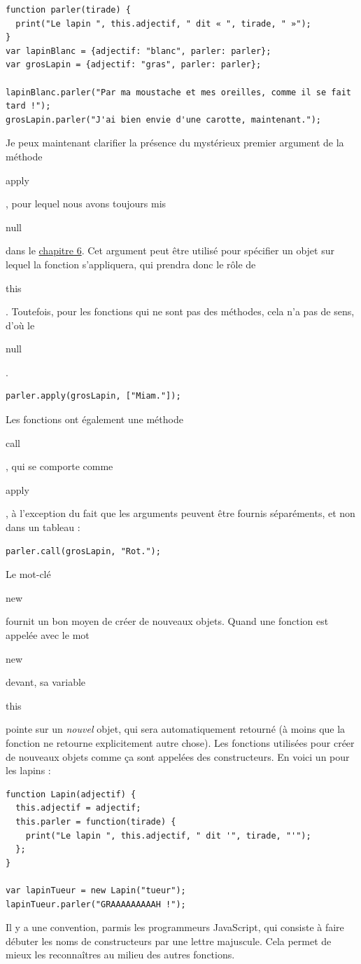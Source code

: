 \documentclass{FramateX}
\renewcommand{\texttt}[1]{\begin{sffamily}{#1}\end{sffamily}}
\begin{document}
\begin{lstlisting}
function parler(tirade) {
  print("Le lapin ", this.adjectif, " dit « ", tirade, " »");
}
var lapinBlanc = {adjectif: "blanc", parler: parler};
var grosLapin = {adjectif: "gras", parler: parler};

lapinBlanc.parler("Par ma moustache et mes oreilles, comme il se fait tard !");
grosLapin.parler("J'ai bien envie d'une carotte, maintenant.");
\end{lstlisting}
\begin{center}\end{center}

Je peux maintenant clarifier la présence du mystérieux premier argument
de la méthode \texttt{apply}, pour lequel nous avons toujours mis
\texttt{null} dans le \href{chapter6.html}{chapitre 6}. Cet argument
peut être utilisé pour spécifier un objet sur lequel la fonction
s'appliquera, qui prendra donc le rôle de \texttt{this}. Toutefois, pour
les fonctions qui ne sont pas des méthodes, cela n'a pas de sens, d'où
le \texttt{null}.

\begin{lstlisting}
parler.apply(grosLapin, ["Miam."]);
\end{lstlisting}
Les fonctions ont également une méthode \texttt{call}, qui se comporte
comme \texttt{apply}, à l'exception du fait que les arguments peuvent
être fournis séparéments, et non dans un tableau :

\begin{lstlisting}
parler.call(grosLapin, "Rot.");
\end{lstlisting}
\begin{center}\end{center}

Le mot-clé \texttt{new} fournit un bon moyen de créer de nouveaux
objets. Quand une fonction est appelée avec le mot \texttt{new} devant,
sa variable \texttt{this} pointe sur un \emph{nouvel} objet, qui sera
automatiquement retourné (à moins que la fonction ne retourne
explicitement autre chose). Les fonctions utilisées pour créer de
nouveaux objets comme ça sont appelées des constructeurs. En voici un
pour les lapins :

\begin{lstlisting}
function Lapin(adjectif) {
  this.adjectif = adjectif;
  this.parler = function(tirade) {
    print("Le lapin ", this.adjectif, " dit '", tirade, "'");
  };
}

var lapinTueur = new Lapin("tueur");
lapinTueur.parler("GRAAAAAAAAAH !");
\end{lstlisting}
Il y a une convention, parmis les programmeurs JavaScript, qui consiste
à faire débuter les noms de constructeurs par une lettre majuscule. Cela
permet de mieux les reconnaîtres au milieu des autres fonctions.
\end{document}
